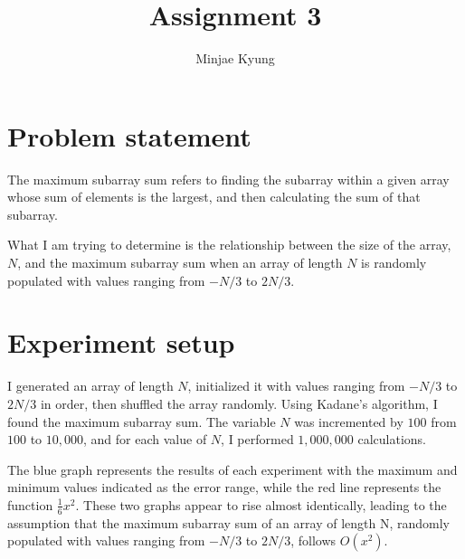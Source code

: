 \documentclass{article}
\title{Assignment 3}
\author{Minjae Kyung}
\begin{document}
\section{Problem statement}
The maximum subarray sum refers to finding the subarray within a given array whose sum of elements is the largest, and then calculating the sum of that subarray.

What I am trying to determine is the relationship between the size of the array, $N$, and the maximum subarray sum when an array of length $N$ is randomly populated with values ranging from $-N/3$ to $2N/3$.

\section{Experiment setup}
I generated an array of length $N$, initialized it with values ranging from $-N/3$ to $2N/3$ in order, then shuffled the array randomly. Using Kadane's algorithm, I found the maximum subarray sum. The variable $N$ was incremented by $100$ from $100$ to $10,000$, and for each value of $N$, I performed $1,000,000$ calculations.


The blue graph represents the results of each experiment with the maximum and minimum values indicated as the error range, while the red line represents the function $\frac{1}{6}x^2$. These two graphs appear to rise almost identically, leading to the assumption that the maximum subarray sum of an array of length N, randomly populated with values ranging from $-N/3$ to $2N/3$, follows $O(x^2)$.
\end{document}
